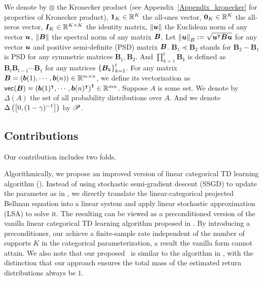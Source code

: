 We denote by $\otimes$ the Kronecker product (see Appendix~\ref{Appendix_kronecker} for properties of Kronecker product), $\bm{1}_K\in{\mathbb R}^K$ the all-ones vector, $\bm{0}_K\in{\mathbb R}^K$ the all-zeros vector, ${\bm{I}}_K\in{\mathbb R}^{K\times K}$ the identity matrix, $\left\|{{\bm{u}}}\right\|$ the Euclidean norm of any vector ${\bm{u}}$, $\left\|{{\bm{B}}}\right\|$ the spectral norm of any matrix ${\bm{B}}$. 
Let $\left\|{{\bm{u}}}\right\|_B:=\sqrt{{\bm{u}}^{\intercal}{\bm{B}}{\bm{u}}}$ for any vector ${\bm{u}}$ and positive semi-definite (PSD) matrix ${\bm{B}}$.
$\bm B_1 \preccurlyeq \bm B_2$ stands for $\bm B_2-\bm B_1$ is PSD for any symmetric matrices $\bm B_1, \bm B_2$.
And $\prod_{k=1}^t \bm{B}_k$ is defined as $\bm{B}_t\bm{B}_{t-1}\cdots \bm{B}_1$ for any matrices $\left\{{\bm{B}_k}\right\}_{k=1}^t$.
For any matrix ${\bm{B}}=({\bm{b}}(1),\cdots,{\bm{b}}(n))\in{\mathbb R}^{m\times n}$, we define its vectorization as $\mathsf{vec}({\bm{B}})=\left({{\bm{b}}(1)^{\intercal},\cdots,{\bm{b}}(n)^{\intercal}}\right)^{\intercal}\in{\mathbb R}^{mn}$.
Suppose $A$ is some set. We denote by $\Delta(A)$ the set of all probability distributions over $A$.
And we denote $\Delta\left({\left[{0,(1-\gamma)^{-1}}\right]}\right)$ by ${\mathscr{P}}$.

\subsection{Contributions}
Our contribution includes two folds.

Algorithmically, we propose an improved version of linear categorical TD learning algorithm (\LCTD).
Instead of using stochastic semi-gradient descent (SSGD) to update the parameter as in \citep{bellemare2019distributional,lyle2019comparative,bdr2022}, we directly translate the linear-categorical projected Bellman equation into a linear system and apply linear stochastic approximation (LSA) to solve it.
The resulting {\LCTD} can be viewed as a preconditioned version of the vanilla linear categorical TD learning algorithm proposed in \citep[Section~9.6][]{bdr2022}. 
By introducing a preconditioner, our {\LCTD} achieve a finite-sample rate independent of the number of supports $K$ in the categorical parameterization, a result the vanilla form cannot attain.
We also note that our proposed \LCTD\ is similar to the algorithm in \citep{lyle2019comparative}, with the distinction that our approach ensures the total mass of the estimated return distributions always be $1$.

